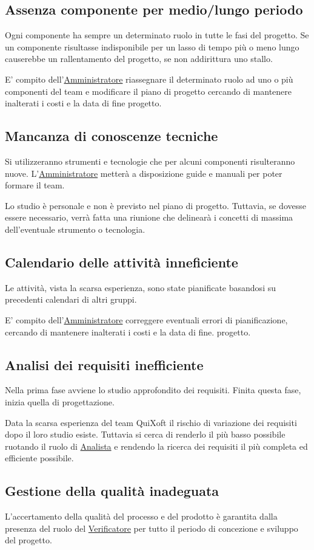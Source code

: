 \documentclass[11pt,a4paper]{article}
\begin{document}
\subsection{Assenza componente per medio/lungo periodo}
Ogni componente ha sempre un determinato ruolo in tutte le fasi del progetto.
Se un componente risultasse indisponibile per un lasso di tempo più o meno lungo causerebbe un rallentamento del progetto, se non addirittura uno stallo.

E' compito dell'\underline{Amministratore} riassegnare il determinato ruolo ad uno o più componenti del team e modificare il piano di progetto cercando di mantenere inalterati i costi e la data di fine progetto.
\subsection{Mancanza di conoscenze tecniche}
Si utilizzeranno strumenti e tecnologie che per alcuni componenti risulteranno nuove.
L'\underline{Amministratore} metterà a disposizione guide e manuali per poter formare il team.

Lo studio è personale e non è previsto nel piano di progetto.
Tuttavia, se dovesse essere necessario, verrà fatta una riunione che delinearà i concetti di massima dell'eventuale strumento o tecnologia.
\subsection{Calendario delle attività inneficiente}
Le attività, vista la scarsa esperienza, sono state pianificate basandosi su precedenti calendari di altri gruppi.

E' compito dell'\underline{Amministratore} correggere eventuali errori di pianificazione, cercando di mantenere inalterati i costi e la data di fine. progetto.
\subsection{Analisi dei requisiti inefficiente}
Nella prima fase avviene lo studio approfondito dei requisiti.
Finita questa fase, inizia quella di progettazione.

Data la scarsa esperienza del team QuiXoft il rischio di variazione dei requisiti dopo il loro studio esiste. Tuttavia si cerca di renderlo il più basso possibile ruotando il ruolo di \underline{Analista} e rendendo la ricerca dei requisiti il più completa ed efficiente possibile.
\subsection{Gestione della qualità inadeguata}
L'accertamento della qualità del processo e del prodotto è garantita dalla presenza del ruolo del \underline{Verificatore} per tutto il periodo di concezione e sviluppo del progetto.
\end{document}
